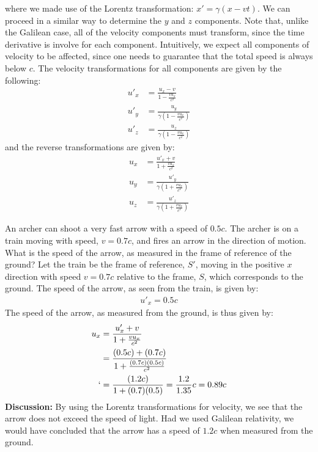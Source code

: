 where we made use of the Lorentz transformation: $x'=\gamma (x-vt)$. We can proceed in a similar way to determine the $y$ and $z$ components. Note that, unlike the Galilean case, all of the velocity components must transform, since the time derivative is involve for each component. Intuitively, we expect all components of velocity to be affected, since one needs to guarantee that the total speed is always below $c$. The velocity transformations for all components are given by the following:
\begin{align*}
u'_x&=\frac{u_x -v}{1- \frac{vu_x}{c^2}}\\
u'_y &=\frac{u_y}{\gamma\left(1- \frac{vu_x}{c^2}\right)}\\
u'_z &=\frac{u_z}{\gamma\left(1- \frac{vu_x}{c^2}\right)}
\end{align*}
and the reverse transformations are given by:
\begin{align*}
u_x &=\frac{u'_x +v}{1+ \frac{vu_x}{c^2}}\\
u_y &=\frac{u'_y}{\gamma\left(1+ \frac{vu_x}{c^2}\right)}\\
u_z &=\frac{u'_z}{\gamma\left(1+ \frac{vu_x}{c^2}\right)}
\end{align*}
\begin{example}{An archer can shoot a very fast arrow with a speed of $0.5c$. The archer is on a train moving with speed, $v=0.7c$, and fires an arrow in the direction of motion. What is the speed of the arrow, as measured in the frame of reference of the ground?}
Let the train be the frame of reference, $S'$, moving in the positive $x$ direction with speed $v=0.7c$ relative to the frame, $S$, which corresponds to the ground. The speed of the arrow, as seen from the train, is given by:
\begin{align*}
u'_x = 0.5c
\end{align*}
The speed of the arrow, as measured from the ground, is thus given by:
\begin{align*}
u_x &=\frac{u'_x +v}{1+ \frac{vu_x}{c^2}}\\
&=\frac{(0.5c) +(0.7c)}{1+ \frac{(0.7c)(0.5c)}{c^2}}\\`
&=\frac{(1.2c)}{1+(0.7)(0.5)}=\frac{1.2}{1.35}c=0.89c
\end{align*}
\textbf{Discussion:} By using the Lorentz transformations for velocity, we see that the arrow does not exceed the speed of light. Had we used Galilean relativity, we would have concluded that the arrow has a speed of $1.2c$ when measured from the ground. 
\end{example}

